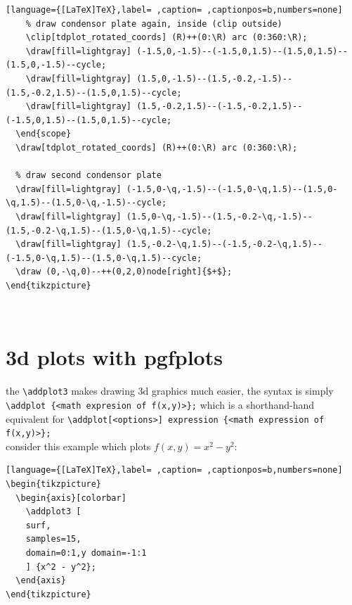 \documentclass[a4paper,12pt]{article}
\begin{document}
\begin{lstlisting}[language={[LaTeX]TeX},label= ,caption= ,captionpos=b,numbers=none]
    % draw condensor plate again, inside (clip outside)
    \clip[tdplot_rotated_coords] (R)++(0:\R) arc (0:360:\R);
    \draw[fill=lightgray] (-1.5,0,-1.5)--(-1.5,0,1.5)--(1.5,0,1.5)--(1.5,0,-1.5)--cycle;
    \draw[fill=lightgray] (1.5,0,-1.5)--(1.5,-0.2,-1.5)--(1.5,-0.2,1.5)--(1.5,0,1.5)--cycle;
    \draw[fill=lightgray] (1.5,-0.2,1.5)--(-1.5,-0.2,1.5)--(-1.5,0,1.5)--(1.5,0,1.5)--cycle;
  \end{scope}
  \draw[tdplot_rotated_coords] (R)++(0:\R) arc (0:360:\R);

  % draw second condensor plate
  \draw[fill=lightgray] (-1.5,0-\q,-1.5)--(-1.5,0-\q,1.5)--(1.5,0-\q,1.5)--(1.5,0-\q,-1.5)--cycle;
  \draw[fill=lightgray] (1.5,0-\q,-1.5)--(1.5,-0.2-\q,-1.5)--(1.5,-0.2-\q,1.5)--(1.5,0-\q,1.5)--cycle;
  \draw[fill=lightgray] (1.5,-0.2-\q,1.5)--(-1.5,-0.2-\q,1.5)--(-1.5,0-\q,1.5)--(1.5,0-\q,1.5)--cycle;
  \draw (0,-\q,0)--++(0,2,0)node[right]{$+$};
\end{tikzpicture}
\end{lstlisting}

\\[0pt]

\section{3d plots with pgfplots}
\label{sec:orgf1b6c85}

the \texttt{\textbackslash{}addplot3} makes drawing 3d graphics much easier, the syntax is simply \texttt{\textbackslash{}addplot \{<math expresion of f(x,y)>\};} which is a shorthand-hand equivalent for \texttt{\textbackslash{}addplot[<options>] expression \{<math expression of f(x,y)>\};}\\[0pt]

consider this example which plots \(f(x,y) = x^2 - y^2\):\\[0pt]

\begin{lstlisting}[language={[LaTeX]TeX},label= ,caption= ,captionpos=b,numbers=none]
\begin{tikzpicture}
  \begin{axis}[colorbar]
    \addplot3 [
    surf,
    samples=15,
    domain=0:1,y domain=-1:1
    ] {x^2 - y^2};
  \end{axis}
\end{tikzpicture}
\end{lstlisting}

\\[0pt]
\end{document}
